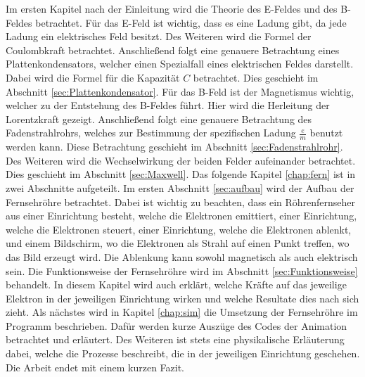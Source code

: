 Im ersten Kapitel nach der Einleitung wird die Theorie des E-Feldes und des B-Feldes betrachtet.
Für das E-Feld ist wichtig, dass es eine Ladung gibt, da jede Ladung ein elektrisches Feld besitzt.
Des Weiteren wird die Formel der Coulombkraft betrachtet.
Anschließend folgt eine genauere Betrachtung eines Plattenkondensators, welcher einen Spezialfall eines elektrischen Feldes darstellt.
Dabei wird die Formel für die Kapazität $C$ betrachtet.
Dies geschieht im Abschnitt \ref{sec:Plattenkondensator}.
Für das B-Feld ist der Magnetismus wichtig, welcher zu der Entstehung des B-Feldes führt.
Hier wird die Herleitung der Lorentzkraft gezeigt.
Anschließend folgt eine genauere Betrachtung des Fadenstrahlrohrs, welches zur Bestimmung der spezifischen Ladung $\frac{e}{m}$ benutzt werden kann.
Diese Betrachtung geschieht im Abschnitt \ref{sec:Fadenstrahlrohr}.
Des Weiteren wird die Wechselwirkung der beiden Felder aufeinander betrachtet.
Dies geschieht im Abschnitt \ref{sec:Maxwell}.
Das folgende Kapitel \ref{chap:fern} ist in zwei Abschnitte aufgeteilt.
Im ersten Abschnitt \ref{sec:aufbau} wird der Aufbau der Fernsehröhre betrachtet.
Dabei ist wichtig zu beachten, dass ein Röhrenfernseher aus einer Einrichtung besteht, welche die Elektronen emittiert, einer Einrichtung, welche die Elektronen steuert, einer Einrichtung, welche die Elektronen ablenkt, und einem Bildschirm, wo die Elektronen als Strahl auf einen Punkt treffen, wo das Bild erzeugt wird.
Die Ablenkung kann sowohl magnetisch als auch elektrisch sein.
Die Funktionsweise der Fernsehröhre wird im Abschnitt \ref{sec:Funktionsweise} behandelt.
In diesem Kapitel wird auch erklärt, welche Kräfte auf das jeweilige Elektron in der jeweiligen Einrichtung wirken und welche Resultate dies nach sich zieht.
Als nächstes wird in Kapitel \ref{chap:sim} die Umsetzung der Fernsehröhre im Programm beschrieben.
Dafür werden kurze Auszüge des Codes der Animation betrachtet und erläutert.
Des Weiteren ist stets eine physikalische Erläuterung dabei, welche die Prozesse beschreibt, die in der jeweiligen Einrichtung geschehen.
Die Arbeit endet mit einem kurzen Fazit.